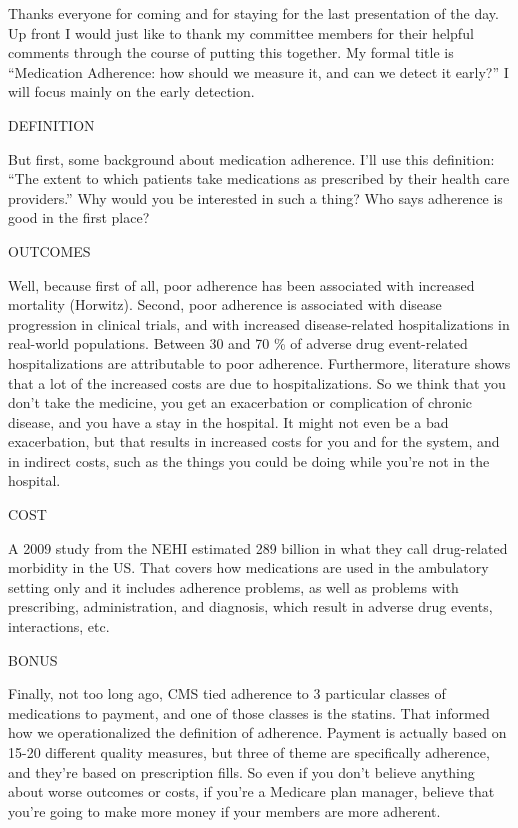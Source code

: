 \documentclass[12pt]{report}
\begin{document}
\begin{large}

Thanks everyone for coming and for staying for the last presentation
of the day. Up front I would just like to thank my committee members
for their helpful comments through the course of putting this
together. My formal title is ``Medication Adherence: how should we
measure it, and can we detect it early?'' I will focus mainly on the
early detection.

DEFINITION

But first, some background about medication adherence. I'll use this
definition: ``The extent to which patients take medications as
prescribed by their health care providers.'' Why would you be
interested in such a thing? Who says adherence is good in the first
place?

OUTCOMES

Well, because first of all, poor adherence has been associated with
increased mortality (Horwitz). Second, poor adherence is associated
with disease progression in clinical trials, and with increased
disease-related hospitalizations in real-world populations. Between 30
and 70 \% of adverse drug event-related hospitalizations are
attributable to poor adherence. Furthermore, literature shows that a
lot of the increased costs are due to hospitalizations. So we think
that you don't take the medicine, you get an exacerbation or
complication of chronic disease, and you have a stay in the hospital.
It might not even be a bad exacerbation, but that results in increased
costs for you and for the system, and in indirect costs, such as the
things you could be doing while you're not in the hospital.

COST

A 2009 study from the NEHI estimated 289 billion in what they call
drug-related morbidity in the US. That covers how medications are used
in the ambulatory setting only and it includes adherence problems, as
well as problems with prescribing, administration, and diagnosis,
which result in adverse drug events, interactions, etc.

BONUS

Finally, not too long ago, CMS tied adherence to 3 particular classes
of medications to payment, and one of those classes is the statins.
That informed how we operationalized the definition of adherence.
Payment is actually based on 15-20 different quality measures, but
three of theme are specifically adherence, and they're based on
prescription fills. So even if you don't believe anything about worse
outcomes or costs, if you're a Medicare plan manager, believe that
you're going to make more money if your members are more adherent.


\end{large}
\end{document}
